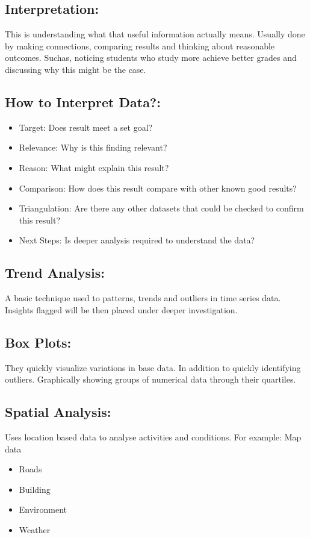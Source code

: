 \documentclass[a5paper]{article}
\begin{document}
	\subsection{Interpretation:}
	This is understanding what that useful information actually means. Usually done by making connections, comparing results and thinking about reasonable outcomes. Suchas, noticing students who study more achieve better grades and discussing why this might be the case.
	\subsection{How to Interpret Data?:}
	\begin{itemize}
		\item Target: Does result meet a set goal?
		\item Relevance: Why is this finding relevant?
		\item Reason: What might explain this result?
		\item Comparison: How does this result compare with other known good results?
		\item Triangulation: Are there any other datasets that could be checked to confirm this result?
		\item Next Steps: Is deeper analysis required to understand the data?
	\end{itemize}
	\subsection{Trend Analysis:}
	A basic technique used to patterns, trends and outliers in time series data. Insights flagged will be then placed under deeper investigation.
	\subsection{Box Plots:}
	They quickly visualize variations in base data. In addition to quickly identifying outliers. Graphically showing groups of numerical data through their quartiles.
	\subsection{Spatial Analysis:}
	Uses location based data to analyse activities and conditions. For example: Map data
	\begin{itemize}
		\item Roads
		\item Building
		\item Environment
		\item Weather
	\end{itemize}
\end{document}
